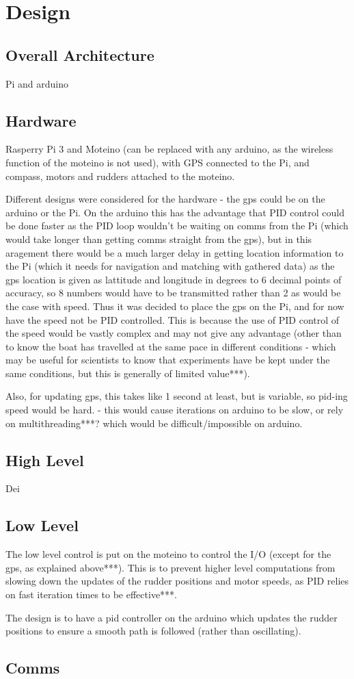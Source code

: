 \section{Design}
\subsection{Overall Architecture}
Pi and arduino

\subsection{Hardware}
Rasperry Pi 3 and Moteino (can be replaced with any arduino, as the wireless
function of the moteino is not used), with GPS connected to the Pi, and compass,
motors and rudders attached to the moteino. 

Different designs were considered for the hardware - the gps could be on the arduino or the Pi. On the arduino this has the advantage that PID control could be done faster as the PID loop wouldn't be waiting on comms from the Pi (which would take longer than getting comms straight from the gps), but in this aragement there would be a much larger delay in getting location information to the Pi (which it needs for navigation and matching with gathered data) as the gps location is given as lattitude and longitude in degrees to 6 decimal points
of accuracy, so 8 numbers would have to be transmitted rather than 2 as would be the case with speed. Thus it was decided to place the gps on the Pi, and for now have the speed not be PID controlled. This is because the use of PID control of the speed would be vastly complex and may not give any advantage (other than to know the boat has travelled at the same pace in different conditions - which may be useful for scientists to know that experiments have be kept under the same conditions, but this is generally of limited value***).

Also, for updating gps, this takes like 1 second at least, but is variable, so pid-ing speed would be hard. - this would cause iterations on arduino to be slow, or rely on multithreading***? which would be difficult/impossible on arduino.


\subsection{High Level}
Dei

\subsection{Low Level}
The low level control is put on the moteino to control the I/O (except for the gps, as explained above***). This is to prevent higher level computations from slowing down the updates of the rudder positions and motor speeds, as PID relies on fast iteration times to be effective***. 

The design is to have a pid controller on the arduino which updates the rudder positions to ensure a smooth path is followed (rather than oscillating).

\subsection{Comms}
